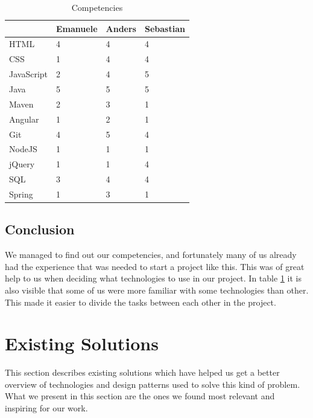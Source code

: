 \begin{table}
\begin{center}
\begin{tabular}{ l | l | l | l }
  \hline
  & Emanuele & Anders & Sebastian \\ \hline
  HTML & 4 & 4 & 4 \\
  CSS  & 1 & 4 & 4 \\
  JavaScript & 2 & 4 & 5 \\
  Java & 5 & 5 & 5 \\
  Maven & 2 & 3 & 1 \\
  Angular & 1 & 2 & 1 \\
  Git & 4 & 5 & 4 \\
  NodeJS & 1 & 1 & 1 \\
  jQuery & 1 & 1 & 4 \\
  SQL & 3 & 4 & 4 \\
  Spring & 1 & 3 & 1 \\
  \hline
\end{tabular}
\end{center}
\caption{Competencies}
\label{table:competencies}
\end{table}

\subsection{Conclusion}

We managed to find out our competencies, and fortunately many of us already had the experience that was needed to start a project like this.
This was of great help to us when deciding what technologies to use in our project.
In table \ref{table:competencies} it is also visible that some of us were more familiar with some technologies than other.
This made it easier to divide the tasks between each other in the project.


\section{Existing Solutions}
\label{section:existing-solutions}

This section describes existing solutions which have helped us get a better overview of technologies and
design patterns used to solve this kind of problem. What we present in this section are the ones we found
most relevant and inspiring for our work.

